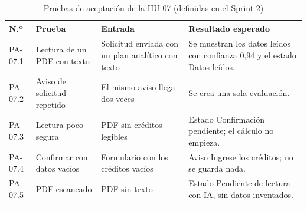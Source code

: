 \begin{longtable}{|p{1.4cm}|p{3.7cm}|p{4.6cm}|p{5.1cm}|}
\hline\rowcolor{grisTarjeta}\textbf{N.º} & \textbf{Prueba} & \textbf{Entrada} & \textbf{Resultado esperado}\\\hline
\endhead
PA-07.1 & Lectura de un PDF con texto & Solicitud enviada con un plan analítico con texto & Se muestran los datos leídos con confianza 0,94 y el estado Datos leídos.\\\hline
PA-07.2 & Aviso de solicitud repetido & El mismo aviso llega dos veces & Se crea una sola evaluación.\\\hline
PA-07.3 & Lectura poco segura & PDF sin créditos legibles & Estado Confirmación pendiente; el cálculo no empieza.\\\hline
PA-07.4 & Confirmar con datos vacíos & Formulario con los créditos vacíos & Aviso Ingrese los créditos; no se guarda nada.\\\hline
PA-07.5 & PDF escaneado & PDF sin texto & Estado Pendiente de lectura con IA, sin datos inventados.\\\hline
\caption{Pruebas de aceptación de la HU-07 (definidas en el Sprint 2)}
\end{longtable}


